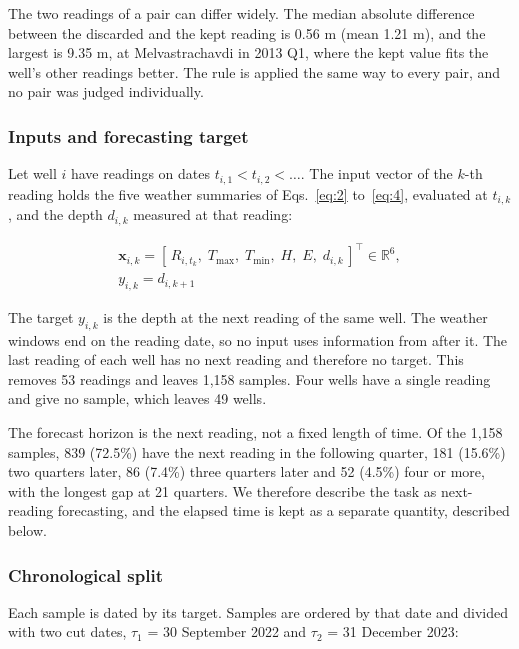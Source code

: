 \documentclass[conference]{IEEEtran}
\begin{document}
The two readings of a pair can differ widely. The median absolute difference between the discarded and the kept reading is 0.56 m (mean 1.21 m), and the largest is 9.35 m, at Melvastrachavdi in 2013 Q1, where the kept value fits the well's other readings better. The rule is applied the same way to every pair, and no pair was judged individually.

\subsubsection{Inputs and forecasting target}

Let well \(i\) have readings on dates \(t_{i,1} < t_{i,2} < \dots\). The input vector of the \(k\)-th reading holds the five weather summaries of Eqs.~\eqref{eq:2} to~\eqref{eq:4}, evaluated at \(t_{i,k}\), and the depth \(d_{i,k}\) measured at that reading:

\begin{equation}
\begin{gathered}
\mathbf{x}_{i,k} = \left[\, R_{i,t_k},\; T_{\max},\; T_{\min},\; H,\; E,\; d_{i,k} \,\right]^{\top} \in \mathbb{R}^{6}, \\
y_{i,k} = d_{i,k+1}
\end{gathered}\label{eq:5}
\end{equation}

The target \(y_{i,k}\) is the depth at the next reading of the same well. The weather windows end on the reading date, so no input uses information from after it. The last reading of each well has no next reading and therefore no target. This removes 53 readings and leaves 1,158 samples. Four wells have a single reading and give no sample, which leaves 49 wells.

The forecast horizon is the next reading, not a fixed length of time. Of the 1,158 samples, 839 (72.5\%) have the next reading in the following quarter, 181 (15.6\%) two quarters later, 86 (7.4\%) three quarters later and 52 (4.5\%) four or more, with the longest gap at 21 quarters. We therefore describe the task as next-reading forecasting, and the elapsed time is kept as a separate quantity, described below.

\subsubsection{Chronological split}

Each sample is dated by its target. Samples are ordered by that date and divided with two cut dates, \(\tau_1\) = 30 September 2022 and \(\tau_2\) = 31 December 2023:
\end{document}
